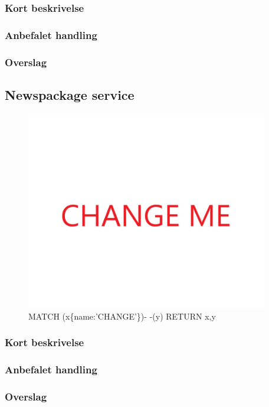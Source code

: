 \documentclass{article}
\begin{document}
\subsubsection{Kort beskrivelse}
\subsubsection{Anbefalet handling}
\subsubsection{Overslag}
\subsection{Newspackage service}
\begin{figure}[h]
\includegraphics[width=300pt]{CHANGE.PNG}
\caption{MATCH (x\{name:'CHANGE'\})- -(y) RETURN x,y}
\end{figure}
\subsubsection{Kort beskrivelse}
\subsubsection{Anbefalet handling}
\subsubsection{Overslag}
\end{document}
